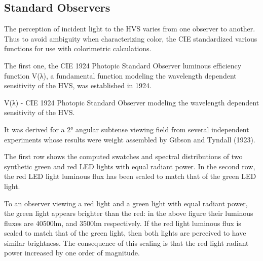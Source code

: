 \subsection{Standard Observers}%
\label{subsec:standard-observers}

The perception of incident light to the HVS varies from one observer to another. Thus to avoid ambiguity when characterizing color, the CIE standardized various functions for use with colorimetric calculations.

The first one, the CIE 1924 Photopic Standard Observer luminous efficiency function V(λ), a fundamental function modeling the wavelength dependent sensitivity of the HVS, was established in 1924.

V(λ) - CIE 1924 Photopic Standard Observer modeling the wavelength dependent sensitivity of the HVS.

It was derived for a 2° angular subtense viewing field from several independent experiments whose results were weight assembled by Gibson and Tyndall (1923).

The first row shows the computed swatches and spectral distributions of two synthetic green and red LED lights with equal radiant power. In the second row, the red LED light luminous flux has been scaled to match that of the green LED light.

To an observer viewing a red light and a green light with equal radiant power, the green light appears brighter than the red: in the above figure their luminous fluxes are 40500lm, and 3500lm respectively. If the red light luminous flux is scaled to match that of the green light, then both lights are perceived to have similar brightness. The consequence of this scaling is that the red light radiant power increased by one order of magnitude.





